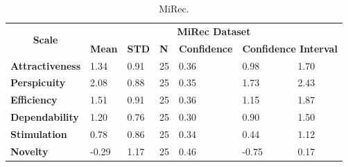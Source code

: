 \begin{table}[t]
\centering
\begin{tabular}{|l|l|l|l|l|l|l|}
\hline
\multicolumn{1}{|c|}{\multirow{2}{*}{\textbf{Scale}}} & \multicolumn{6}{c|}{\textbf{MiRec Dataset}}                                                                         \\ \cline{2-7} 
\multicolumn{1}{|c|}{}                                & \textbf{Mean} & \textbf{STD} & \textbf{N} & \textbf{Confidence} & \multicolumn{2}{l|}{\textbf{Confidence Interval}} \\ \hline
\textbf{Attractiveness}                               & 1.34          & 0.91         & 25         & 0.36                & 0.98                     & 1.70                   \\ \hline
\textbf{Perspicuity}                                  & 2.08          & 0.88         & 25         & 0.35                & 1.73                     & 2.43                   \\ \hline
\textbf{Efficiency}                                   & 1.51          & 0.91         & 25         & 0.36                & 1.15                     & 1.87                   \\ \hline
\textbf{Dependability}                                & 1.20          & 0.76         & 25         & 0.30                & 0.90                     & 1.50                   \\ \hline
\textbf{Stimulation}                                  & 0.78          & 0.86         & 25         & 0.34                & 0.44                     & 1.12                   \\ \hline
\textbf{Novelty}                                      & -0.29         & 1.17         & 25         & 0.46                & -0.75                    & 0.17                   \\ \hline
\end{tabular}
\caption{MiRec.}
\label{table:table51}
\end{table}

